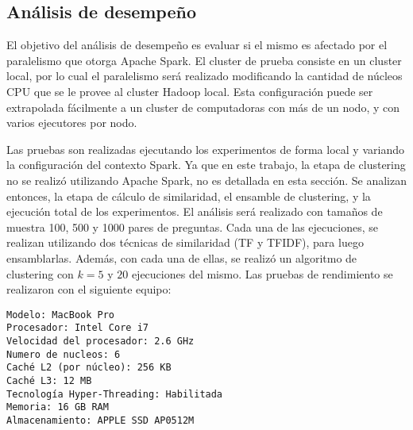 \subsection{Análisis de desempeño}

El objetivo del análisis de desempeño es evaluar si el mismo es afectado por el paralelismo que otorga Apache Spark. El cluster de prueba consiste en un cluster local, por lo cual el paralelismo será realizado modificando la cantidad de núcleos CPU que se le provee al cluster Hadoop local. Esta configuración puede ser extrapolada fácilmente a un cluster de computadoras con más de un nodo, y con varios ejecutores por nodo.

\bigskip Las pruebas son realizadas ejecutando los experimentos de forma local y variando la configuración del contexto Spark. Ya que en este trabajo, la etapa de clustering no se realizó utilizando Apache Spark, no es detallada en esta sección. Se analizan entonces, la etapa de cálculo de similaridad, el ensamble de clustering, y la ejecución total de los experimentos. El análisis será realizado con tamaños de muestra 100, 500 y 1000 pares de preguntas. Cada una de las ejecuciones, se realizan utilizando dos técnicas de similaridad (TF y TFIDF), para luego ensamblarlas. Además, con cada una de ellas, se realizó un algoritmo de clustering con \(k = 5\) y \(20\) ejecuciones del mismo. Las pruebas de rendimiento se realizaron con el siguiente equipo:

\begin{verbatim}
Modelo: MacBook Pro
Procesador: Intel Core i7
Velocidad del procesador: 2.6 GHz
Numero de nucleos: 6
Caché L2 (por núcleo): 256 KB
Caché L3: 12 MB
Tecnología Hyper-Threading: Habilitada
Memoria: 16 GB RAM
Almacenamiento: APPLE SSD AP0512M
\end{verbatim}

